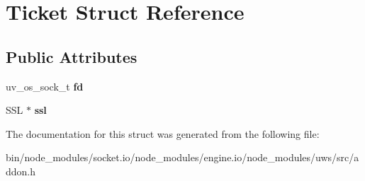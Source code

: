 \hypertarget{struct_ticket}{}\section{Ticket Struct Reference}
\label{struct_ticket}
\subsection*{Public Attributes}
\begin{DoxyCompactItemize}
\item 
\mbox{\label{struct_ticket_a50067bfa40d26affc8de0da5a03d7d05}} 
uv\+\_\+os\+\_\+sock\+\_\+t {\bfseries fd}
\item 
\mbox{\label{struct_ticket_a7fc483a4ac919db7faf501c03465ed5c}} 
S\+SL $\ast$ {\bfseries ssl}
\end{DoxyCompactItemize}


The documentation for this struct was generated from the following file\+:\begin{DoxyCompactItemize}
\item 
bin/node\+\_\+modules/socket.\+io/node\+\_\+modules/engine.\+io/node\+\_\+modules/uws/src/addon.\+h\end{DoxyCompactItemize}
